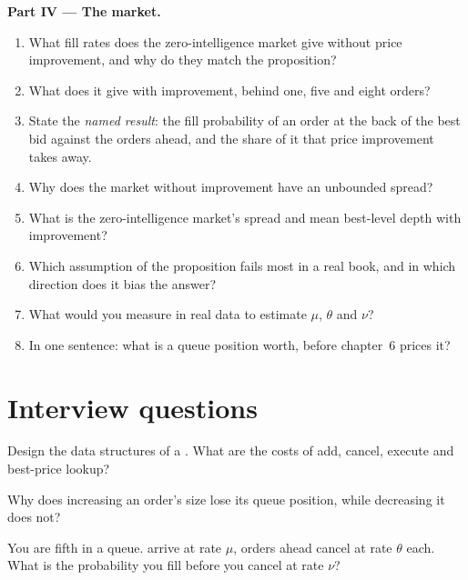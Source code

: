 \begin{problem}
\medskip\noindent\textbf{Part IV --- The market.}
\begin{enumerate}[resume]
\item What fill rates does the zero-intelligence market give without price improvement, and why do they match the proposition?
\item What does it give with improvement, behind one, five and eight orders?
\item State the \emph{named result}: the fill probability of an order at the back of the best bid against the orders ahead, and the share of it
that price improvement takes away.
\item Why does the market without improvement have an unbounded spread?
\item What is the zero-intelligence market's spread and mean best-level depth with improvement?
\item Which assumption of the proposition fails most in a real book, and in which direction does it bias the answer?
\item What would you measure in real data to estimate $\mu$, $\theta$ and $\nu$?
\item In one sentence: what is a queue position worth, before chapter~6 prices it?
\end{enumerate}
\end{problem}

\section{Interview questions}

\begin{interviewq}\label{iq:mx:the-limit-order-book:1}
Design the data structures of a . What are the costs of add, cancel, execute and best-price lookup?
\end{interviewq}

\begin{interviewq}\label{iq:mx:the-limit-order-book:2}
Why does increasing an order's size lose its queue position, while decreasing it does not?
\end{interviewq}

\begin{interviewq}\label{iq:mx:the-limit-order-book:3}
You are fifth in a queue.  arrive at rate $\mu$, orders ahead cancel at rate $\theta$ each. What is the probability you fill before you
cancel at rate $\nu$?
\end{interviewq}

